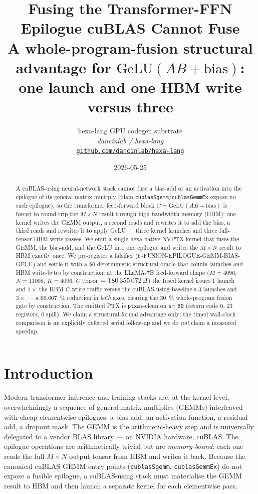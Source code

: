 \documentclass[11pt,a4paper]{article}
\title{
  \textbf{Fusing the Transformer-FFN Epilogue cuBLAS Cannot Fuse}\\[4pt]
  \large A whole-program-fusion structural advantage for $\mathrm{GeLU}(AB+\mathrm{bias})$:
  one launch and one HBM write versus three
}
\author{
  hexa-lang GPU codegen substrate\\
  \normalsize\textit{dancinlab / hexa-lang}\\[2pt]
  \normalsize\href{https://github.com/dancinlab/hexa-lang}{\texttt{github.com/dancinlab/hexa-lang}}
}
\date{2026-05-25}
\begin{document}
\maketitle

\begin{abstract}
A cuBLAS-using neural-network stack cannot fuse a bias-add or an activation
into the epilogue of its general matrix multiply (plain
\texttt{cublasSgemm}/\texttt{cublasGemmEx} expose no such epilogue), so the
transformer feed-forward block $C = \mathrm{GeLU}(AB + \mathrm{bias})$ is
forced to round-trip the $M\times N$ result through high-bandwidth memory
(HBM): one kernel writes the GEMM output, a second reads and rewrites it to
add the bias, a third reads and rewrites it to apply GeLU --- three kernel
launches and three full-tensor HBM write passes. We emit a single hexa-native
NVPTX kernel that fuses the GEMM, the bias-add, and the GeLU into one
epilogue and writes the $M\times N$ result to HBM exactly once. We
pre-register a falsifier (F-FUSION-EPILOGUE-GEMM-BIAS-GELU) and settle it with
a \$0 deterministic structural oracle that counts launches and HBM
write-bytes by construction: at the LLaMA-7B feed-forward shape
($M=4096$, $N=11008$, $K=4096$; $C$ tensor $=\SI{180355072}{\byte}$) the fused
kernel issues $1$ launch and $1\times$ the HBM $C$-write traffic versus the
cuBLAS-using baseline's $3$ launches and $3\times$ --- a \SI{66.667}{\percent}
reduction in \emph{both} axes, clearing the \SI{30}{\percent} whole-program
fusion gate by construction. The emitted PTX is \texttt{ptxas}-clean on
\texttt{sm\_80} (return code $0$, $23$ registers, $0$ spill). We claim a
structural-formal advantage only; the timed wall-clock comparison is an
explicitly deferred serial follow-up and we do \emph{not} claim a measured
speedup.
\end{abstract}

\section{Introduction}
\label{sec:intro}

Modern transformer inference and training stacks are, at the kernel level,
overwhelmingly a sequence of general matrix multiplies (GEMMs) interleaved
with cheap elementwise epilogues: a bias add, an activation function, a
residual add, a dropout mask. The GEMM is the arithmetic-heavy step and is
universally delegated to a vendor BLAS library --- on NVIDIA hardware, cuBLAS.
The epilogue operations are arithmetically trivial but are
\emph{memory-bound}: each one reads the full $M\times N$ output tensor from
HBM and writes it back. Because the canonical cuBLAS GEMM entry points
(\texttt{cublasSgemm}, \texttt{cublasGemmEx}) do not expose a fusible
epilogue, a cuBLAS-using stack must materialise the GEMM result to HBM and
then launch a separate kernel for each elementwise pass.
\end{document}
